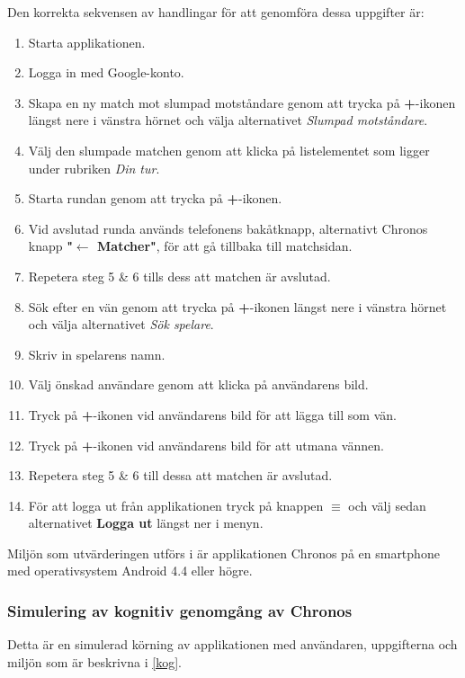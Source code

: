 \documentclass[a4paper, 11pt]{article}
\begin{document}
Den korrekta sekvensen av handlingar för att genomföra dessa uppgifter är:
\begin{enumerate}
\item Starta applikationen.
\item Logga in med Google-konto.
\item Skapa en ny match mot slumpad motståndare genom att trycka på \textbf{+}-ikonen längst nere i vänstra hörnet och välja alternativet \textit{Slumpad motståndare}.
\item Välj den slumpade matchen genom att klicka på listelementet som ligger under rubriken \textit{Din tur}. 
\item Starta rundan genom att trycka på \textbf{+}-ikonen.
\item Vid avslutad runda används telefonens bakåtknapp, alternativt Chronos knapp \textbf{"$\leftarrow$ Matcher"}, för att gå tillbaka till matchsidan.
\item Repetera steg 5 \& 6 tills dess att matchen är avslutad.
\item Sök efter en vän genom att trycka på \textbf{+}-ikonen längst nere i vänstra hörnet och välja alternativet \textit{Sök spelare}.
\item Skriv in spelarens namn.
\item Välj önskad användare genom att klicka på användarens bild.
\item Tryck på \textbf{+}-ikonen vid användarens bild för att lägga till som vän.
\item Tryck på \textbf{+}-ikonen vid användarens bild för att utmana vännen.
\item Repetera steg 5 \& 6 till dessa att matchen är avslutad.
\item För att logga ut från applikationen tryck på knappen \textbf{$\equiv$} och välj sedan alternativet \textbf{Logga ut} längst ner i menyn.
\end{enumerate}

Miljön som utvärderingen utförs i är applikationen Chronos på en smartphone med operativsystem Android 4.4 eller högre.

\subsubsection{Simulering av kognitiv genomgång av Chronos}
Detta är en simulerad körning av applikationen med användaren, uppgifterna och miljön som är beskrivna i \ref{kog}.
\end{document}

